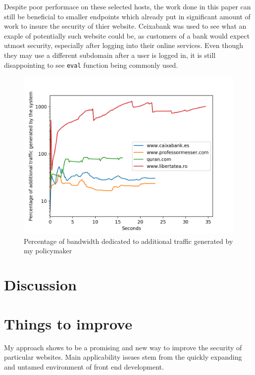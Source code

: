 Despite poor performace on these selected hosts, the work done in this paper can still be beneficial to smaller endpoints which already put in significant amount of work to insure the security of thier website.
Ceixabank was used to see what an exaple of potentially such website could be, as customers of a bank would expect utmost security, especially after logging into their online services.
Even though they may use a different subdomain after a user is logged in, it is still disappointing to see \texttt{eval} function being commonly used.


\begin{figure}[h]
	\centering
	\includegraphics[width=\textwidth]{imgs/netword_usage_plot.png}
	\caption{Percentage of bandwidth dedicated to additional traffic generated by my policymaker}
\end{figure}


\section{Discussion}


\section{Things to improve}

My approach shows to be a promising and new way to improve the security of particular websites.
Main applicability issues stem from the quickly expanding and untamed environment of front end development.

